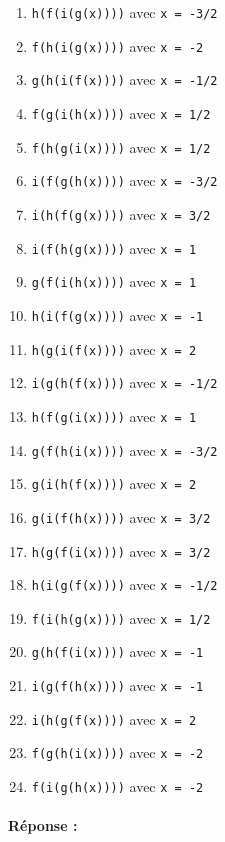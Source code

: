 \documentclass[11pt,a4paper]{article}
\begin{document}
\noindent\begin{minipage}{7cm}
\begin{enumerate}
\item \texttt{h(f(i(g(x))))} avec \texttt{x = -3/2}
\item \texttt{f(h(i(g(x))))} avec \texttt{x = -2} 
\item \texttt{g(h(i(f(x))))} avec \texttt{x = -1/2}
\item \texttt{f(g(i(h(x))))} avec \texttt{x = 1/2}
\item \texttt{f(h(g(i(x))))} avec \texttt{x = 1/2}
\item \texttt{i(f(g(h(x))))} avec \texttt{x = -3/2}
\item \texttt{i(h(f(g(x))))} avec \texttt{x = 3/2}
\item \texttt{i(f(h(g(x))))} avec \texttt{x = 1}
\item \texttt{g(f(i(h(x))))} avec \texttt{x = 1}
\item \texttt{h(i(f(g(x))))} avec \texttt{x = -1}
\item \texttt{h(g(i(f(x))))} avec \texttt{x = 2}
\item \texttt{i(g(h(f(x))))} avec \texttt{x = -1/2}
\end{enumerate}
\end{minipage}
\hfill
\begin{minipage}{7cm}
\begin{enumerate}\setcounter{enumi}{12}
\item \texttt{h(f(g(i(x))))} avec \texttt{x = 1}
\item \texttt{g(f(h(i(x))))} avec \texttt{x = -3/2}
\item \texttt{g(i(h(f(x))))} avec \texttt{x = 2}
\item \texttt{g(i(f(h(x))))} avec \texttt{x = 3/2}
\item \texttt{h(g(f(i(x))))} avec \texttt{x = 3/2}
\item \texttt{h(i(g(f(x))))} avec \texttt{x = -1/2}
\item \texttt{f(i(h(g(x))))} avec \texttt{x = 1/2}
\item \texttt{g(h(f(i(x))))} avec \texttt{x = -1}
\item \texttt{i(g(f(h(x))))} avec \texttt{x = -1}
\item \texttt{i(h(g(f(x))))} avec \texttt{x = 2}
\item \texttt{f(g(h(i(x))))} avec \texttt{x = -2} 
\item \texttt{f(i(g(h(x))))} avec \texttt{x = -2} 
\end{enumerate}
\end{minipage}

\paragraph{Réponse :} \mbox{}

\noindent\framebox[\textwidth]{$\rule{0cm}{7cm}$}
\end{document}
